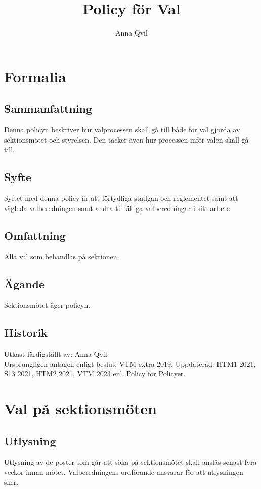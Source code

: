 \documentclass{dsekprotokoll}
\title{Policy för Val}
\author{Anna Qvil}
\begin{document}
\maketitle
\section{Formalia}
\subsection{Sammanfattning}
Denna policyn beskriver hur valprocessen skall gå till både för val gjorda av sektionsmötet och styrelsen. Den täcker även hur processen inför valen skall gå till.

\subsection{Syfte}
Syftet med denna policy är att förtydliga stadgan och reglementet samt att vägleda valberedningen samt andra tillfälliga valberedningar i sitt arbete

\subsection{Omfattning}
Alla val som behandlas på sektionen.

\subsection{Ägande}
Sektionsmötet äger policyn.

\subsection{Historik}
Utkast färdigställt av: Anna Qvil \\
Ursprungligen antagen enligt beslut: VTM extra 2019.
Uppdaterad: HTM1 2021, S13 2021, HTM2 2021, VTM 2023 enl. Policy för Policyer.


\section{Val på sektionsmöten}

\subsection{Utlysning}
Utlysning av de poster som går att söka på sektionsmötet skall anslås senast fyra veckor innan mötet. Valberedningens ordförande ansvarar för att utlysningen sker.
\end{document}
